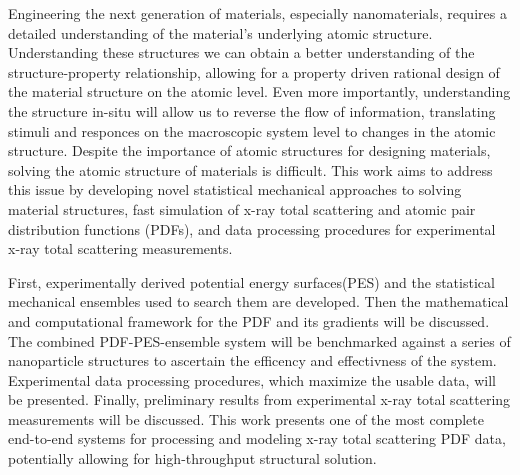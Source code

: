 Engineering the next generation of materials, especially nanomaterials, requires a detailed understanding of the material's underlying atomic structure.
Understanding these structures we can obtain a better understanding of the structure-property relationship, allowing for a property driven rational design of the material structure on the atomic level.
Even more importantly, understanding the structure in-situ will allow us to reverse the flow of information, translating stimuli and responces on the macroscopic system level to changes in the atomic structure.
Despite the importance of atomic structures for designing materials, solving the atomic structure of materials is difficult.
This work aims to address this issue by developing novel statistical mechanical approaches to solving material structures, fast simulation of x-ray total scattering and atomic pair distribution functions (PDFs), and data processing procedures for experimental x-ray total scattering measurements.

First, experimentally derived potential energy surfaces(PES) and the statistical mechanical ensembles used to search them are developed.
Then the mathematical and computational framework for the PDF and its gradients will be discussed.
The combined PDF-PES-ensemble system will be benchmarked against a series of nanoparticle structures to ascertain the efficency and effectivness of the system.
Experimental data processing procedures, which maximize the usable data, will be presented.
Finally, preliminary results from experimental x-ray total scattering measurements will be discussed.
This work presents one of the most complete end-to-end systems for processing and modeling x-ray total scattering PDF data, potentially allowing for high-throughput structural solution.